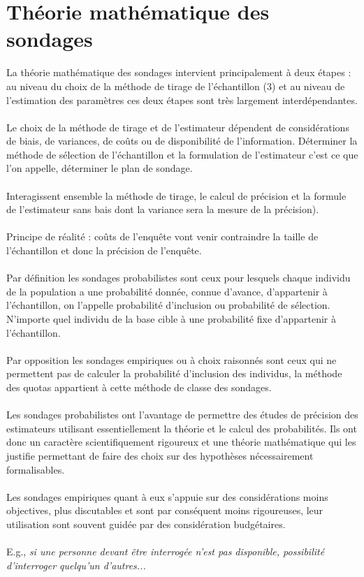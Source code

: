 \documentclass{article}
\begin{document}
\section{Théorie mathématique des sondages}
La théorie mathématique des sondages intervient principalement à deux étapes : au niveau du choix de la méthode de tirage de l'échantillon (3) et au niveau de l'estimation des paramètres ces deux étapes sont très largement interdépendantes. \\ \\
Le choix de la méthode de tirage et de l'estimateur dépendent de considérations de biais, de variances, de coûts ou de disponibilité de l'information. Déterminer la méthode de sélection de l'échantillon et la formulation de l'estimateur c'est ce que l'on appelle, déterminer le plan de sondage.\\ \\
Interagissent ensemble la méthode de tirage, le calcul de précision et la formule  de l'estimateur sans bais dont la variance sera la mesure de la précision). \\ \\
Principe de réalité : coûts de l'enquête vont venir contraindre la taille de l'échantillon et donc la précision de l'enquête. \\ \\
Par définition les sondages probabilistes sont ceux pour lesquels chaque individu de la population a une probabilité donnée, connue d'avance, d'appartenir à l'échantillon, on l'appelle probabilité d'inclusion ou probabilité de sélection. N'importe quel individu de la base cible à une probabilité fixe d'appartenir à l'échantillon. \\ \\
Par opposition les sondages empiriques ou à choix raisonnés sont ceux qui ne permettent pas de calculer la probabilité d'inclusion des individus, la méthode des quotas appartient à cette méthode de classe des sondages. \\ \\
Les sondages probabilistes ont l'avantage de permettre des études de précision des estimateurs utilisant essentiellement la théorie et le calcul des probabilités. Ils ont donc un caractère scientifiquement rigoureux et une théorie mathématique qui les justifie permettant de faire des choix sur des hypothèses nécessairement formalisables. \\ \\
Les sondages empiriques quant à eux s'appuie sur des considérations moins objectives, plus discutables et sont par conséquent moins rigoureuses, leur utilisation sont souvent guidée par des considération budgétaires. \\ \\
E.g., \textit{si une personne devant être interrogée n'est pas disponible, possibilité d'interroger quelqu'un d'autres...}
\end{document}
